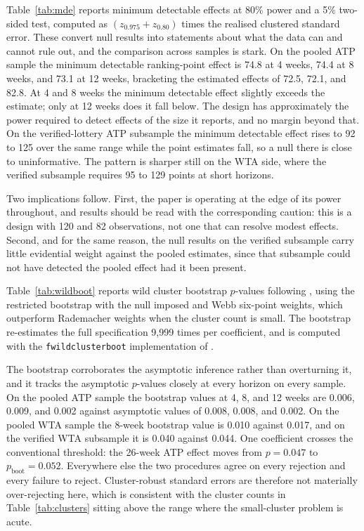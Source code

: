 Table~\ref{tab:mde} reports minimum detectable effects at 80\% power and a 5\% two-sided test, computed as $(z_{0.975} + z_{0.80})$ times the realised clustered standard error. These convert null results into statements about what the data can and cannot rule out, and the comparison across samples is stark. On the pooled ATP sample the minimum detectable ranking-point effect is 74.8 at 4 weeks, 74.4 at 8 weeks, and 73.1 at 12 weeks, bracketing the estimated effects of 72.5, 72.1, and 82.8. At 4 and 8 weeks the minimum detectable effect slightly exceeds the estimate; only at 12 weeks does it fall below. The design has approximately the power required to detect effects of the size it reports, and no margin beyond that. On the verified-lottery ATP subsample the minimum detectable effect rises to 92 to 125 over the same range while the point estimates fall, so a null there is close to uninformative. The pattern is sharper still on the WTA side, where the verified subsample requires 95 to 129 points at short horizons.

Two implications follow. First, the paper is operating at the edge of its power throughout, and results should be read with the corresponding caution: this is a design with 120 and 82 observations, not one that can resolve modest effects. Second, and for the same reason, the null results on the verified subsample carry little evidential weight against the pooled estimates, since that subsample could not have detected the pooled effect had it been present.

Table~\ref{tab:wildboot} reports wild cluster bootstrap $p$-values following \citet{Cameron2008_wildbootstrap}, using the restricted bootstrap with the null imposed and Webb six-point weights, which outperform Rademacher weights when the cluster count is small. The bootstrap re-estimates the full specification 9{,}999 times per coefficient, and is computed with the \texttt{fwildclusterboot} implementation of \citet{Roodman2019_fastwild}.

The bootstrap corroborates the asymptotic inference rather than overturning it, and it tracks the asymptotic $p$-values closely at every horizon on every sample. On the pooled ATP sample the bootstrap values at 4, 8, and 12 weeks are 0.006, 0.009, and 0.002 against asymptotic values of 0.008, 0.008, and 0.002. On the pooled WTA sample the 8-week bootstrap value is 0.010 against 0.017, and on the verified WTA subsample it is 0.040 against 0.044. One coefficient crosses the conventional threshold: the 26-week ATP effect moves from $p = 0.047$ to $p_{\text{boot}} = 0.052$. Everywhere else the two procedures agree on every rejection and every failure to reject. Cluster-robust standard errors are therefore not materially over-rejecting here, which is consistent with the cluster counts in Table~\ref{tab:clusters} sitting above the range where the small-cluster problem is acute.

